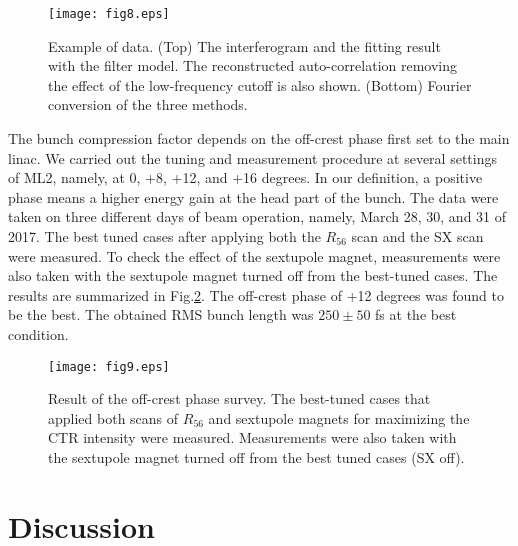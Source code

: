 \documentclass[review]{elsarticle}
\begin{document}
\begin{figure}[htb]
	\begin{center}
	 \texttt{[image: fig8.eps]}
	  \caption{
Example of data.
(Top) The interferogram and the fitting result with the filter model.
The reconstructed auto-correlation removing the effect of the low-frequency cutoff
is also shown.
(Bottom)
Fourier conversion of the three methods.
}
	\label{fig:datafitting}
\end{center}
\end{figure}

The bunch compression factor depends 
on the off-crest phase first set to the main linac.
We carried out the tuning and measurement procedure
at several settings of ML2,
namely, at 0, +8, +12, and +16 degrees.
In our definition,
a positive phase means a higher energy gain at the head part of the bunch.
The data were taken on three different days of beam operation,
namely, March 28, 30, and 31 of 2017.
The best tuned cases after applying both the $R_{56}$ scan
and the SX scan were measured.
To check the effect of the sextupole magnet,
measurements were also taken with
the sextupole magnet turned off from the best-tuned cases.
The results are summarized in Fig.\ref{fig:offphasescan}.
The off-crest phase of +12 degrees was found to be the best.
The obtained RMS bunch length was $250\pm50$ fs
at the best condition.

\begin{figure}[htb]
	\begin{center}
	 \texttt{[image: fig9.eps]}
	  \caption{
Result of the off-crest phase survey.
The best-tuned cases that applied both scans of $R_{56}$ and sextupole magnets
for maximizing the CTR intensity were measured.
Measurements were also taken with 
the sextupole magnet turned off from the best tuned cases (SX off).
}
	\label{fig:offphasescan}
\end{center}
\end{figure}

\section{Discussion}
\end{document}
